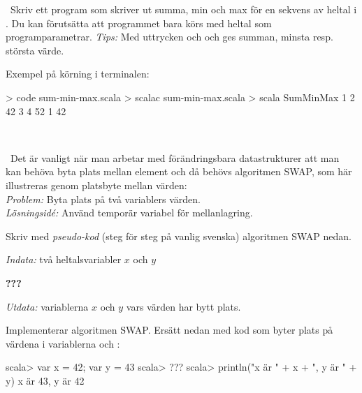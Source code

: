 
\QUESTBEGIN

\Task \what~Skriv ett program som skriver ut summa, min och max för en sekvens av heltal i . Du kan förutsätta att programmet bara körs med heltal som programparametrar. \emph{Tips:} Med uttrycken  och  och  ges summan, minsta resp. största värde.

Exempel på körning i terminalen:
\begin{REPL}
> code sum-min-max.scala
> scalac sum-min-max.scala
> scala SumMinMax 1 2 42 3 4
52 1 42
\end{REPL}

\SOLUTION

\TaskSolved \what~


\QUESTEND







\QUESTBEGIN

\Task  \what~Det är vanligt när man arbetar med förändringsbara datastrukturer att man kan behöva byta plats mellan element och då behövs algoritmen SWAP, som här illustreras genom platsbyte mellan värden:
\\ \emph{Problem:} Byta plats på två variablers värden. \\\emph{Lösningsidé:} Använd temporär variabel för mellanlagring.

\Subtask Skriv med \emph{pseudo-kod} (steg för steg på vanlig svenska) algoritmen SWAP nedan.

\emph{Indata:} två heltalsvariabler $x$ och $y$

\textbf{???}

\emph{Utdata:} variablerna $x$ och $y$ vars värden har bytt plats.

\Subtask Implementerar algoritmen SWAP. Ersätt  nedan med kod som byter plats på värdena i variablerna  och :

\begin{REPL}
scala> var x = 42; var y = 43
scala> ???
scala> println("x är " + x + ", y är " + y)
x är 43, y är 42
\end{REPL}

\SOLUTION

